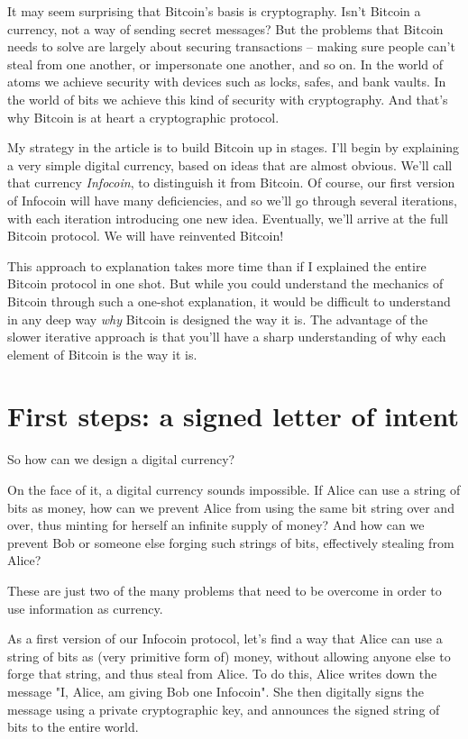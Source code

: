 \documentclass[12pt]{book}
\newcounter{problem}[chapter]
\begin{document}
%
%
It may seem surprising that Bitcoin's basis is cryptography.  Isn't
Bitcoin a currency, not a way of sending secret messages?  But the
problems that Bitcoin needs to solve are largely about securing
transactions -- making sure people can't steal from one another, or
impersonate one another, and so on.  In the world of atoms we achieve
security with devices such as locks, safes, and bank vaults.  In the
world of bits we achieve this kind of security with cryptography.  And
that's why Bitcoin is at heart a cryptographic protocol.

My strategy in the article is to build Bitcoin up in stages.  I'll
begin by explaining a very simple digital currency, based on ideas
that are almost obvious.  We'll call that currency \emph{Infocoin}, to
distinguish it from Bitcoin.  Of course, our first version of Infocoin
will have many deficiencies, and so we'll go through several
iterations, with each iteration introducing one new idea. Eventually,
we'll arrive at the full Bitcoin protocol.  We will have reinvented
Bitcoin!

This approach to explanation takes more time than if I explained the
entire Bitcoin protocol in one shot.  But while you could understand
the mechanics of Bitcoin through such a one-shot explanation, it would
be difficult to understand in any deep way \emph{why} Bitcoin is
designed the way it is.  The advantage of the slower iterative
approach is that you'll have a sharp understanding of why each element
of Bitcoin is the way it is.

\section{First steps: a signed letter of intent}

So how can we design a digital currency?  

On the face of it, a digital currency sounds impossible.  If Alice can
use a string of bits as money, how can we prevent Alice from using the
same bit string over and over, thus minting for herself an infinite
supply of money?  And how can we prevent Bob or someone else forging
such strings of bits, effectively stealing from Alice?

These are just two of the many problems that need to be overcome in
order to use information as currency.

As a first version of our Infocoin protocol, let's find a way that
Alice can use a string of bits as (very primitive form of) money,
without allowing anyone else to forge that string, and thus steal from
Alice.  To do this, Alice writes down the message "I, Alice, am giving
Bob one Infocoin".  She then digitally signs the message using a
private cryptographic key, and announces the signed string of bits to
the entire world.
\end{document}
